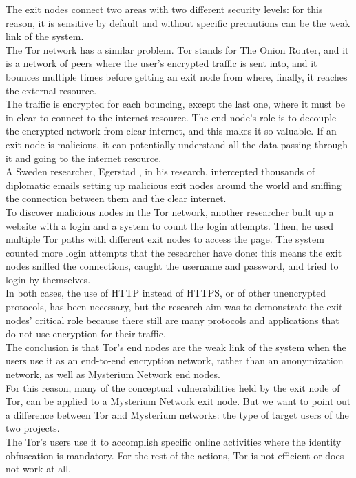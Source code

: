 \documentclass[12pt]{article}
\begin{document}
	The exit nodes connect two areas with two different security levels: for this reason, it is sensitive by default and without specific precautions can be the weak link of the system.\\
	The Tor network has a similar problem. Tor stands for The Onion Router, and it is a network of peers where the user's encrypted traffic is sent into, and it bounces multiple times before getting an exit node from where, finally, it reaches the external resource.\\
	The traffic is encrypted for each bouncing, except the last one, where it must be in clear to connect to the internet resource. The end node's role is to decouple the encrypted network from clear internet, and this makes it so valuable. If an exit node is malicious, it can potentially understand all the data passing through it and going to the internet resource.\\
	A Sweden researcher, Egerstad \cite{exitnodeTOR}, in his research, intercepted thousands of diplomatic emails setting up malicious exit nodes around the world and sniffing the connection between them and the clear internet.\\
	To discover malicious nodes in the Tor network, another researcher built up a website with a login and a system to count the login attempts. Then, he used multiple Tor paths with different exit nodes to access the page. The system counted more login attempts that the researcher have done: this means the exit nodes sniffed the connections, caught the username and password, and tried to login by themselves.\\
	In both cases, the use of HTTP instead of HTTPS, or of other unencrypted protocols, has been necessary, but the research aim was to demonstrate the exit nodes' critical role because there still are many protocols and applications that do not use encryption for their traffic.\\
	The conclusion is that Tor's end nodes are the weak link of the system when the users use it as an end-to-end encryption network, rather than an anonymization network, as well as Mysterium Network end nodes.\\
	For this reason, many of the conceptual vulnerabilities held by the exit node of Tor, can be applied to a Mysterium Network exit node. But we want to point out a difference between Tor and Mysterium networks: the type of target users of the two projects.\\
	The Tor's users use it to accomplish specific online activities where the identity obfuscation is mandatory. For the rest of the actions, Tor is not efficient or does not work at all.\\
\end{document}
